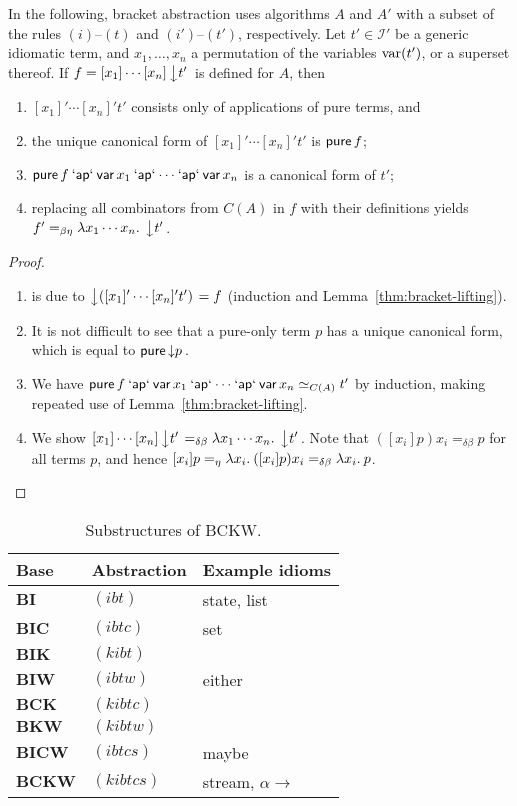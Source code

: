 \begin{theorem}\label{thm:unlifting}
In the following, bracket abstraction uses algorithms $A$ and $A'$ with
a subset of the rules $(i)$--$(t)$ and $(i')$--$(t')$, respectively.
Let $t' \in \mathcal{I}'$ be a generic idiomatic term, and $x_1,\dots,x_n$
a permutation of the variables $\operatorname{var}(t')$, or a superset thereof.
If $f = [x_1]\cdots[x_n]\left\downarrow t'\right.$ is defined for $A$, then
\begin{enumerate}\raggedright
\item $[x_1]'\cdots[x_n]'t'$ consists only of applications of pure terms, and
\item the unique canonical form of $[x_1]'\cdots[x_n]'t'$ is $\operatorname{\mathsf{pure}} f$;
\item $\operatorname{\mathsf{pure}} f \mathbin{\mathsf{`ap`}} \operatorname{\mathsf{var}} x_1 \mathbin{\mathsf{`ap`}} \cdots \mathbin{\mathsf{`ap`}} \operatorname{\mathsf{var}} x_n$ is a canonical
	form of $t'$;
\item replacing all combinators from $C(A)$ in $f$ with their definitions
	yields $f' =_{\beta\eta} \lambda x_1\cdots x_n.\>\left\downarrow t'\right.$.
\end{enumerate}
\end{theorem}
\begin{proof}
\begin{enumerate}
\item is due to $\left\downarrow ([x_1]'\cdots[x_n]'t')\right. = f$ (induction and
	Lemma~\ref{thm:bracket-lifting}).
\item It is not difficult to see that a pure-only term $p$ has a unique canonical
	form, which is equal to $\operatorname{\mathsf{pure}} \left\downarrow p\right.$.
\item We have $\operatorname{\mathsf{pure}} f \mathbin{\mathsf{`ap`}} \operatorname{\mathsf{var}} x_1 \mathbin{\mathsf{`ap`}} \cdots \mathbin{\mathsf{`ap`}} \operatorname{\mathsf{var}} x_n \simeq_{C(A)} t'$
	by induction, making repeated use of Lemma~\ref{thm:bracket-lifting}.
\item We show $[x_1]\cdots[x_n]\left\downarrow t'\right. =_{\delta\beta} \lambda x_1\cdots x_n.\>\left\downarrow t'\right.$.
	Note that $([x_i]p)x_i =_{\delta\beta} p$ for all terms $p$, and hence
	$[x_i]p =_\eta \lambda x_i.\>([x_i]p)x_i =_{\delta\beta} \lambda x_i.\>p$.
\end{enumerate}
\end{proof}

\begin{table}\centering
\begin{tabular}{lll} Base & Abstraction & Example idioms \\
\hline
$\mathbf{BI}$ & $(ibt)$ & state, list \\
$\mathbf{BIC}$ & $(ibtc)$ & set \\
$\mathbf{BIK}$ & $(kibt)$ & \\
$\mathbf{BIW}$ & $(ibtw)$ & either \\
$\mathbf{BCK}$ & $(kibtc)$ & \\
$\mathbf{BKW}$ & $(kibtw)$ & \\
$\mathbf{BICW}$ & $(ibtcs)$ & maybe \\
$\mathbf{BCKW}$ & $(kibtcs)$ & stream, $\alpha \to$ \\
\end{tabular}
\caption{Substructures of BCKW.}
\label{tab:combinator-bases}
\end{table}

